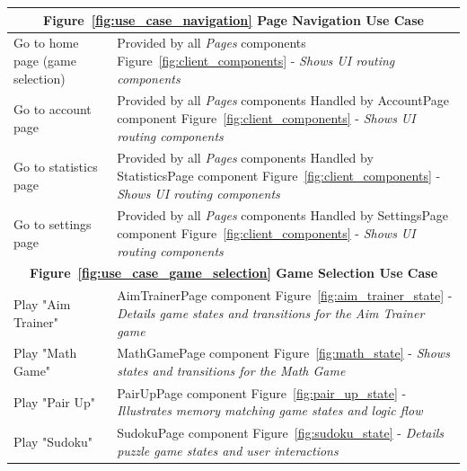 \documentclass[11pt,a4paper]{article}
\begin{document}
\begin{table}
\begin{tabular}{|p{}|p{}|}
\hline
\multicolumn{2}{|c|}{\textbf {Figure~\ref{fig:use_case_navigation} Page Navigation Use Case} }                          \\
\hline
Go to home page (game selection)& Provided by all \textit{Pages} components\newline
Figure~\ref{fig:client_components} - \textit{Shows UI routing components}\\
\hline
Go to account page& Provided by all \textit{Pages} components\newline
Handled by AccountPage component\newline
Figure~\ref{fig:client_components} - \textit{Shows UI routing components}\\
\hline
Go to statistics page& Provided by all \textit{Pages} components\newline
Handled by StatisticsPage component\newline
Figure~\ref{fig:client_components} - \textit{Shows UI routing components}\\
\hline
Go to settings page& Provided by all \textit{Pages} components\newline
Handled by SettingsPage component\newline
Figure~\ref{fig:client_components} - \textit{Shows UI routing components}\\
\hline
\multicolumn{2}{|c|}{\textbf {Figure~\ref{fig:use_case_game_selection} Game Selection Use Case} }           \\
\hline
Play "Aim Trainer"& AimTrainerPage component\newline
Figure~\ref{fig:aim_trainer_state} - \textit{Details game states and transitions for the Aim Trainer game}\\
\hline
Play "Math Game"& MathGamePage component\newline
Figure~\ref{fig:math_state} - \textit{Shows states and transitions for the Math Game}\\
\hline
Play "Pair Up"& PairUpPage component\newline
Figure~\ref{fig:pair_up_state} - \textit{Illustrates memory matching game states and logic flow}\\
\hline
Play "Sudoku"& SudokuPage component\newline
Figure~\ref{fig:sudoku_state} - \textit{Details puzzle game states and user interactions}\\

\end{tabular}
\end{table}
\end{document}
